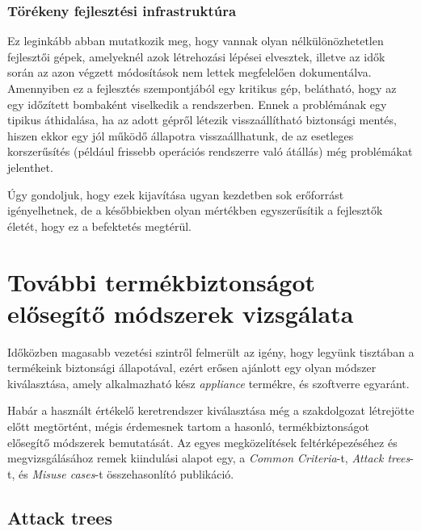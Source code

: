 \subsubsection{Törékeny fejlesztési infrastruktúra}
Ez leginkább abban mutatkozik meg, hogy vannak olyan nélkülönözhetetlen fejlesztői gépek, amelyeknél
azok létrehozási lépései elvesztek, illetve az idők során az azon végzett módosítások nem lettek
megfelelően dokumentálva. Amennyiben ez a fejlesztés szempontjából egy kritikus gép, belátható, hogy
az egy időzített bombaként viselkedik a rendszerben. Ennek a problémának egy tipikus áthidalása, ha
az adott gépről létezik visszaállítható biztonsági mentés, hiszen ekkor egy jól működő állapotra
visszaállhatunk, de az esetleges korszerűsítés (például frissebb operációs rendszerre való átállás)
még problémákat jelenthet.

Úgy gondoljuk, hogy ezek kijavítása ugyan kezdetben sok erőforrást igényelhetnek, de a későbbiekben
olyan mértékben egyszerűsítik a fejlesztők életét, hogy ez a befektetés megtérül.

\section{További termékbiztonságot elősegítő módszerek vizsgálata}

Időközben magasabb vezetési szintről felmerült az igény, hogy legyünk tisztában a termékeink
biztonsági állapotával, ezért erősen ajánlott egy olyan módszer kiválasztása, amely alkalmazható
kész \emph{appliance} termékre, és szoftverre egyaránt.

Habár a használt értékelő keretrendszer kiválasztása még a szakdolgozat létrejötte előtt megtörtént,
mégis érdemesnek tartom a hasonló, termékbiztonságot elősegítő módszerek bemutatását. Az egyes
megközelítések feltérképezéséhez és megvizsgálásához remek kiindulási alapot egy, a \emph{Common
Criteria}-t, \emph{Attack trees}-t, és \emph{Misuse cases}-t összehasonlító publikáció.
\cite{ThreeApproaches}

\subsection{Attack trees}

